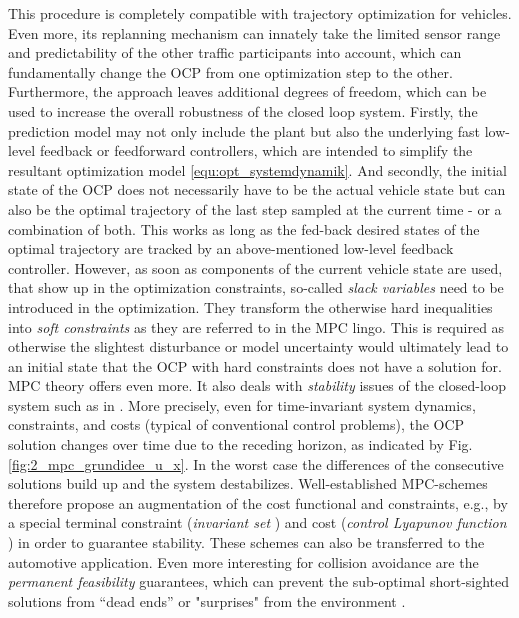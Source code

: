 This procedure is completely compatible with trajectory optimization for vehicles. Even more, its replanning mechanism can innately take the limited sensor range and predictability of the other traffic participants into account, which can fundamentally change the OCP from one optimization step to the other. Furthermore, the approach leaves additional degrees of freedom, which can be used to increase the overall robustness of the closed loop system. Firstly, the prediction model may not only include the plant but also the underlying fast low-level feedback or feedforward controllers, which are intended to simplify the resultant optimization model \eqref{equ:opt_systemdynamik}. And secondly, the initial state of the OCP does not necessarily have to be the actual vehicle state but can also be the optimal trajectory of the last step sampled at the current time - or a combination of both. This works as long as the fed-back desired states of the optimal trajectory are tracked by an above-mentioned low-level feedback controller. However, as soon as components of the current vehicle state are used, that show up in the optimization constraints, so-called \emph{slack variables} need to be introduced in the optimization. They transform the otherwise hard inequalities into \emph{soft constraints} as they are referred to in the MPC lingo. This is required as otherwise the slightest disturbance or model uncertainty would ultimately lead to an initial state that the OCP with hard constraints does not have a solution for.
MPC theory offers even more. It also deals with \emph{stability} issues of the closed-loop system such as in \cite{gruene2011nonlinear}. More precisely, even for time-invariant system dynamics, constraints, and costs (typical of conventional control problems), the OCP solution changes over time due to the receding horizon, as indicated by Fig.\,\ref{fig:2_mpc_grundidee_u_x}. In the worst case the differences of the consecutive solutions build up and the system destabilizes. Well-established MPC-schemes therefore propose an augmentation of the cost functional and constraints, e.g., by a special terminal constraint (\emph{invariant set} \cite{blanchini1999survey})  and cost (\emph{control Lyapunov function} \cite{gruene2011nonlinear}) 
   in order to guarantee stability. These schemes can also be transferred to the automotive application. Even more interesting for collision avoidance are the \emph{permanent feasibility} guarantees, which can prevent the sub-optimal short-sighted solutions from “dead ends” or "surprises" from the environment \cite{pek2020onlineveri, pek2020fail, shalev2017formal}.




